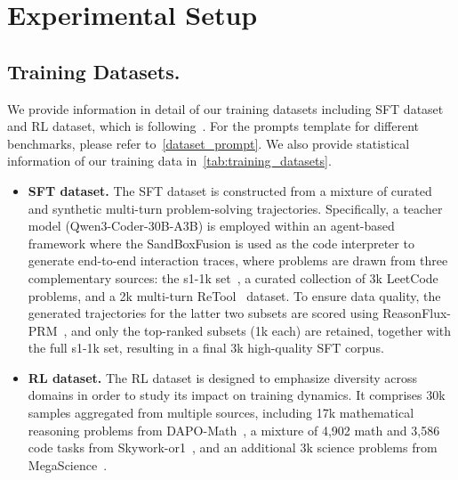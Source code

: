 \section{Experimental Setup}
\label{app:experimental_setup}







\subsection{Training Datasets.}
\label{app:datasets}
We provide information in detail of our training datasets including SFT dataset and RL dataset, which is following~\citet{demy}. For the prompts template for different benchmarks, please refer to~\cref{dataset_prompt}. We also provide statistical information of our training data in~\cref{tab:training_datasets}.


\begin{itemize}

\item \textbf{SFT dataset.} The SFT dataset is constructed from a mixture of curated and synthetic multi-turn problem-solving trajectories. Specifically, a teacher model (Qwen3-Coder-30B-A3B) is employed within an agent-based framework where the SandBoxFusion is used as the code interpreter to generate end-to-end interaction traces, where problems are drawn from three complementary sources: the s1-1k set~\citep{muennighoff2025s1}, a curated collection of 3k LeetCode problems, and a 2k multi-turn ReTool~\citep{feng2025retool} dataset. To ensure data quality, the generated trajectories for the latter two subsets are scored using ReasonFlux-PRM~\citep{zou2025reasonflux-prm}, and only the top-ranked subsets (1k each) are retained, together with the full s1-1k set, resulting in a final 3k high-quality SFT corpus.
\item \textbf{RL dataset.} The RL dataset is designed to emphasize diversity across domains in order to study its impact on training dynamics. It comprises 30k samples aggregated from multiple sources, including 17k mathematical reasoning problems from DAPO-Math~\citep{yu2025dapo}, a mixture of 4,902 math and 3,586 code tasks from Skywork-or1~\citep{he2025skywork-or1}, and an additional 3k science problems from MegaScience~\citep{fan2025megascience}.

\end{itemize}

